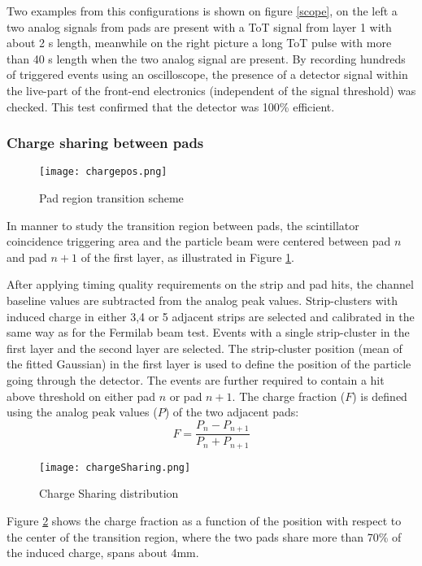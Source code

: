 Two examples from this configurations is shown on figure \ref{scope}, on the left a two analog signals from pads are
present with a ToT signal from layer 1 with about 2 \micro s length, meanwhile on the right picture a long ToT pulse with more
than 40 \micro s length when the two analog signal are present. By recording hundreds of triggered events using an
oscilloscope, the presence of a detector signal within the live-part of the front-end electronics (independent of the
signal threshold) was checked. This test confirmed that the detector was 100\% efficient.\par


\subsubsection{Charge sharing between pads}
\begin{figure}[ht]
\centering
\texttt{[image: chargepos.png]}
\caption{Pad region transition scheme}\label{chargepos}
\end{figure}

In manner to study the transition region between pads, the scintillator coincidence triggering area and the particle
beam were centered between pad $n$ and pad $n+1$ of the first layer, as illustrated in Figure \ref{chargepos}.\par
After applying timing quality requirements on the strip and pad hits, the channel baseline values are subtracted from
the analog peak values. Strip-clusters with induced charge in either 3,4 or 5 adjacent strips are selected and
calibrated in the same way as for the Fermilab beam test. Events with a single strip-cluster in the first layer and the
second layer are selected. The strip-cluster position (mean of the fitted Gaussian) in the first layer is used to define
the position of the particle going through the detector. The events are further required to contain a hit above
threshold on either pad $n$ or pad $n+1$. The charge fraction ($F$) is defined using the analog peak values ($P$) of the two
adjacent pads:
\begin{equation}
F = \frac{P_n - P_{n+1}}{P_n + P_{n+1}}
\end{equation}

\begin{figure}[ht]
\centering
\texttt{[image: chargeSharing.png]}
\caption{Charge Sharing distribution}\label{chargeSharing}
\end{figure}

Figure \ref{chargeSharing} shows the charge fraction as a function of the position with respect to the center of the
transition region, where the two pads share more than 70\% of the induced charge, spans about \unit{4}{mm}.




